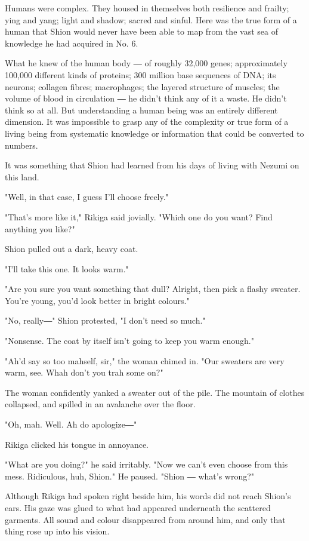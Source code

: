 Humans were complex. They housed in themselves both resilience and
frailty; ying and yang; light and shadow; sacred and sinful. Here was
the true form of a human that Shion would never have been able to map
from the vast sea of knowledge he had acquired in No. 6.

What he knew of the human body ― of roughly 32,000 genes; approximately
100,000 different kinds of proteins; 300 million base sequences of DNA;
its neurons; collagen fibres; macrophages; the layered structure of
muscles; the volume of blood in circulation ― he didn't think any of it
a waste. He didn't think so at all. But understanding a human being was
an entirely different dimension. It was impossible to grasp any of the
complexity or true form of a living being from systematic knowledge or
information that could be converted to numbers.

It was something that Shion had learned from his days of living with
Nezumi on this land.

"Well, in that case, I guess I'll choose freely."

"That's more like it," Rikiga said jovially. "Which one do you want?
Find anything you like?"

Shion pulled out a dark, heavy coat.

"I'll take this one. It looks warm."

"Are you sure you want something that dull? Alright, then pick a flashy
sweater. You're young, you'd look better in bright colours."

"No, really―" Shion protested, "I don't need so much."

"Nonsense. The coat by itself isn't going to keep you warm enough."

"Ah'd say so too mahself, sir," the woman chimed in. "Our sweaters are
very warm, see. Whah don't you trah some on?"

The woman confidently yanked a sweater out of the pile. The mountain of
clothes collapsed, and spilled in an avalanche over the floor.

"Oh, mah. Well. Ah do apologize―"

Rikiga clicked his tongue in annoyance.

"What are you doing?" he said irritably. "Now we can't even choose from
this mess. Ridiculous, huh, Shion." He paused. "Shion ― what's wrong?"

Although Rikiga had spoken right beside him, his words did not reach
Shion's ears. His gaze was glued to what had appeared underneath the
scattered garments. All sound and colour disappeared from around him,
and only that thing rose up into his vision.

